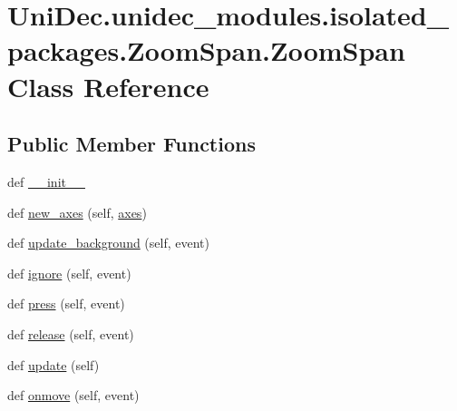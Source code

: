 \hypertarget{class_uni_dec_1_1unidec__modules_1_1isolated__packages_1_1_zoom_span_1_1_zoom_span}{}\section{Uni\+Dec.\+unidec\+\_\+modules.\+isolated\+\_\+packages.\+Zoom\+Span.\+Zoom\+Span Class Reference}
\label{class_uni_dec_1_1unidec__modules_1_1isolated__packages_1_1_zoom_span_1_1_zoom_span}
\subsection*{Public Member Functions}
\begin{DoxyCompactItemize}
\item 
def \hyperlink{class_uni_dec_1_1unidec__modules_1_1isolated__packages_1_1_zoom_span_1_1_zoom_span_afaba16554c36f6662d37bab7664fb247}{\+\_\+\+\_\+init\+\_\+\+\_\+}
\item 
def \hyperlink{class_uni_dec_1_1unidec__modules_1_1isolated__packages_1_1_zoom_span_1_1_zoom_span_a3fe762d8c2638929ccec209a8dc5ada7}{new\+\_\+axes} (self, \hyperlink{class_uni_dec_1_1unidec__modules_1_1isolated__packages_1_1_zoom_span_1_1_zoom_span_af6af08a3bcbf220c15dd8ae804906d35}{axes})
\item 
def \hyperlink{class_uni_dec_1_1unidec__modules_1_1isolated__packages_1_1_zoom_span_1_1_zoom_span_aad9df19ffa6e7aea2b02fb478de0eaab}{update\+\_\+background} (self, event)
\item 
def \hyperlink{class_uni_dec_1_1unidec__modules_1_1isolated__packages_1_1_zoom_span_1_1_zoom_span_a626b6ba7ba66f7b97f8be42c31e538d2}{ignore} (self, event)
\item 
def \hyperlink{class_uni_dec_1_1unidec__modules_1_1isolated__packages_1_1_zoom_span_1_1_zoom_span_a8cfa0f0bc3e6ec230fcd10403c68b741}{press} (self, event)
\item 
def \hyperlink{class_uni_dec_1_1unidec__modules_1_1isolated__packages_1_1_zoom_span_1_1_zoom_span_ac69321bfc370e910f63a1b9d4e0a9218}{release} (self, event)
\item 
def \hyperlink{class_uni_dec_1_1unidec__modules_1_1isolated__packages_1_1_zoom_span_1_1_zoom_span_ae7afb749f398ee0e3cbd93180c460b78}{update} (self)
\item 
def \hyperlink{class_uni_dec_1_1unidec__modules_1_1isolated__packages_1_1_zoom_span_1_1_zoom_span_aaf3c1b1025ceb8425a37f4591bc249ff}{onmove} (self, event)
\end{DoxyCompactItemize}
